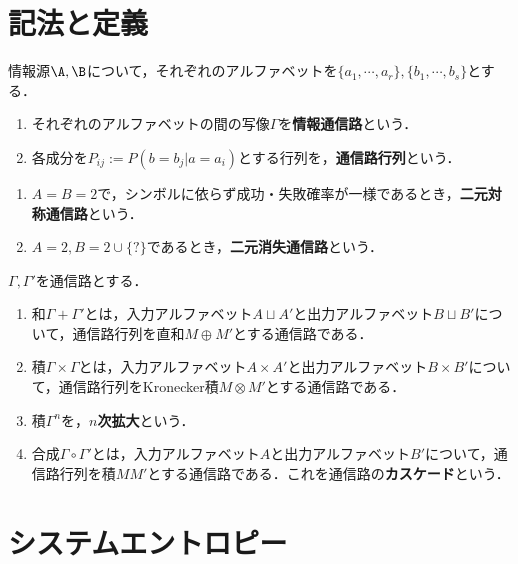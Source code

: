 \documentclass[uplatex,dvipdfmx]{jsreport}
\begin{document}
\section{記法と定義}

\begin{definition}[channel]
    情報源$\A,\B$について，それぞれのアルファベットを$\{a_1,\cdots,a_r\},\{b_1,\cdots,b_s\}$とする．
    \begin{enumerate}
        \item それぞれのアルファベットの間の写像$\Gamma$を\textbf{情報通信路}という．
        \item 各成分を$P_{ij}:=P(b=b_j|a=a_i)$とする行列を，\textbf{通信路行列}という．
    \end{enumerate}
\end{definition}
\begin{example}\mbox{}
    \begin{enumerate}
        \item $A=B=2$で，シンボルに依らず成功・失敗確率が一様であるとき，\textbf{二元対称通信路}という．
        \item $A=2,B=2\cup\{?\}$であるとき，\textbf{二元消失通信路}という．
    \end{enumerate}
\end{example}

\begin{definition}
    $\Gamma,\Gamma'$を通信路とする．
    \begin{enumerate}
        \item 和$\Gamma+\Gamma'$とは，入力アルファベット$A\sqcup A'$と出力アルファベット$B\sqcup B'$について，通信路行列を直和$M\oplus M'$とする通信路である．
        \item 積$\Gamma\times\Gamma$とは，入力アルファベット$A\times A'$と出力アルファベット$B\times B'$について，通信路行列をKronecker積$M\otimes M'$とする通信路である．
        \item 積$\Gamma^n$を，\textbf{$n$次拡大}という．
        \item 合成$\Gamma\circ\Gamma'$とは，入力アルファベット$A$と出力アルファベット$B'$について，通信路行列を積$MM'$とする通信路である．これを通信路の\textbf{カスケード}という．
    \end{enumerate}
\end{definition}

\section{システムエントロピー}
\end{document}
